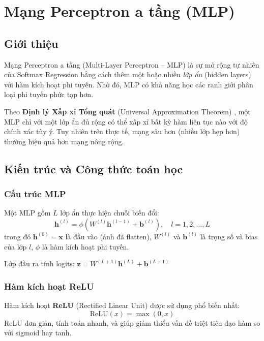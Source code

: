 \documentclass[a4paper]{article}
\theoremstyle{definition}
\begin{document}
\section{Mạng Perceptron \DJ a tầng (MLP)}

\subsection{Giới thiệu}
Mạng Perceptron \DJ a tầng (Multi-Layer Perceptron -- MLP) là sự mở rộng tự nhiên của Softmax Regression bằng cách thêm một hoặc nhiều \textit{lớp ẩn} (hidden layers) với hàm kích hoạt phi tuyến. Nhờ đó, MLP có khả năng học các ranh giới phân loại phi tuyến phức tạp hơn.

Theo \textbf{Định lý Xấp xỉ Tổng quát} (Universal Approximation Theorem) \cite{hornik1989multilayer}, một MLP chỉ với một lớp ẩn đủ rộng có thể xấp xỉ bất kỳ hàm liên tục nào với độ chính xác tùy ý. Tuy nhiên trên thực tế, mạng sâu hơn (nhiều lớp hẹp hơn) thường hiệu quả hơn mạng nông rộng.

\subsection{Kiến trúc và Công thức toán học}

\subsubsection{Cấu trúc MLP}
Một MLP gồm $L$ lớp ẩn thực hiện chuỗi biến đổi:
\begin{equation}
	\mathbf{h}^{(l)} = \phi\left(W^{(l)} \mathbf{h}^{(l-1)} + \mathbf{b}^{(l)}\right), \quad l = 1, 2, \ldots, L
	\label{eq:mlp-hidden}
\end{equation}
trong đó $\mathbf{h}^{(0)} = \mathbf{x}$ là đầu vào (ảnh đã flatten), $W^{(l)}$ và $\mathbf{b}^{(l)}$ là trọng số và bias của lớp $l$, $\phi$ là hàm kích hoạt phi tuyến.

Lớp đầu ra tính logits: $\mathbf{z} = W^{(L+1)} \mathbf{h}^{(L)} + \mathbf{b}^{(L+1)}$

\subsubsection{Hàm kích hoạt ReLU}
Hàm kích hoạt \textbf{ReLU} (Rectified Linear Unit) được sử dụng phổ biến nhất:
\begin{equation}
	\text{ReLU}(x) = \max(0, x)
	\label{eq:relu}
\end{equation}
ReLU đơn giản, tính toán nhanh, và giúp giảm thiểu vấn đề triệt tiêu đạo hàm so với sigmoid hay tanh.
\end{document}
